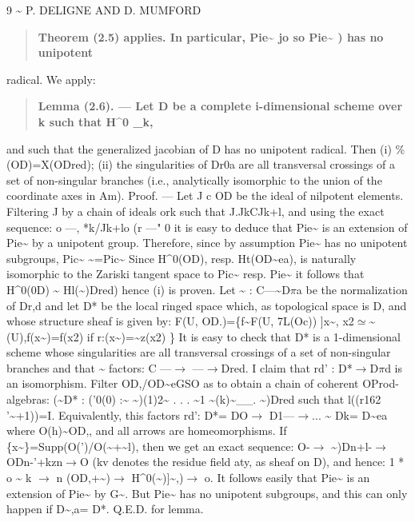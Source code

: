 \documentclass[11pt]{article}
\theoremstyle{plain}
\theoremstyle{definition}
\theoremstyle{remark}
\begin{document}
9 \textasciitilde{} P. DELIGNE AND D. MUMFORD

\begin{quote}\textbf{Theorem (2.5) applies. In particular, Pie\textasciitilde{} jo so Pie\textasciitilde{} ) has no unipotent}\end{quote}
radical. We apply:

\begin{quote}\textbf{Lemma (2.6). --- Let D be a complete i-dimensional scheme over k such that H\textasciicircum{}0 \_k,}\end{quote}
and such that the generalized jacobian of D has no unipotent radical. Then (i) \%(OD)=X(ODred); (ii) the singularities of Dr0a are all transversal crossings of a set of non-singular branches (i.e., analytically isomorphic to the union of the coordinate axes in Am). Proof. --- Let J c OD be the ideal of nilpotent elements. Filtering J by a chain of ideals ork such that J.JkCJk+l, and using the exact sequence: o ---, *k/Jk+lo (r ---" 0 it is easy to deduce that Pie\textasciitilde{} is an extension of Pie\textasciitilde{} by a unipotent group. Therefore, since by assumption Pie\textasciitilde{} has no unipotent subgroups, Pic\textasciitilde{} \textasciitilde{}=Pic\textasciitilde{} Since H\textasciicircum{}0(OD), resp. Ht(OD\textasciitilde{}ea), is naturally isomorphic to the Zariski tangent space to Pic\textasciitilde{} resp. Pie\textasciitilde{} it follows that H\textasciicircum{}0(0D) \textasciitilde{} Hl(\textasciitilde{})Dred) hence (i) is proven. Let \textasciitilde{} : C---\textasciitilde{}D$\pi$a be the normalization of Dr,d and let D* be the local ringed space which, as topological space is D, and whose structure sheaf is given by: F(U, OD.)=\{f\textasciitilde{}F(U, 7L(Oc)) ]x\textasciitilde{}, x2$\simeq$\textasciitilde{}(U),f(x\textasciitilde{})=f(x2) if r:(x\textasciitilde{})=\textasciitilde{}z(x2) \} It is easy to check that D* is a 1-dimensional scheme whose singularities are all transversal crossings of a set of non-singular branches and that \textasciitilde{} factors: C ---$\to$ ---$\to$Dred. I claim that rd' : D*$\to$D$\pi$d is an isomorphism. Filter OD,/OD\textasciitilde{}eGSO as to obtain a chain of coherent OProd-algebras: (\textasciitilde{}D* : ('0(0) :\textasciitilde{} \textasciitilde{})(1)2\textasciitilde{} . . . \textasciitilde{}1 \textasciitilde{}(k)\textasciitilde{}\_\_. \textasciitilde{})Dred such that l((r162 '\textasciitilde{}+1))=I. Equivalently, this factors rd': D*= DO$\to$ D1---$\to$... \textasciitilde{} Dk= D\textasciitilde{}ea where O(h)\textasciitilde{}OD,, and all arrows are homeomorphisms. If \{x\textasciitilde{}\}=Supp(O(')/O(\textasciitilde{}+\textasciitilde{}l), then we get an exact sequence: O-$\to$ \textasciitilde{})Dn+l-$\to$ ODn-'+kzn$\to$O (kv denotes the residue field aty, as sheaf on D), and hence: 1 * o \textasciitilde{} k $\to$ n (OD,+\textasciitilde{})$\to$ H\textasciicircum{}0(\textasciitilde{})]\textasciitilde{},)$\to$ o. It follows easily that Pie\textasciitilde{} is an extension of Pie\textasciitilde{} by G\textasciitilde{}. But Pie\textasciitilde{} has no unipotent subgroups, and this can only happen if D\textasciitilde{},a= D*. Q.E.D. for lemma.
\end{document}
